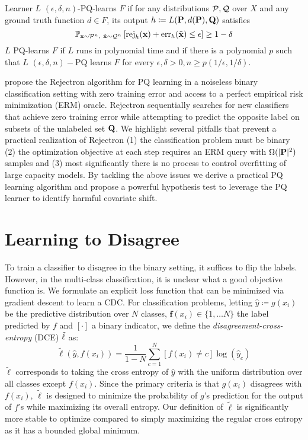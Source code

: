 \begin{definition}
    Learner $L$ $(\epsilon, \delta, n)$-PQ-learns $F$ if for any distributions $\mathcal{P}, \mathcal{Q}$ over $X$ and any ground truth function $d \in F$, its output $h\coloneqq L(\mathbf{P}, d(\mathbf{P}), \mathbf{Q})$ satisfies
    \begin{equation}
        \mathbb{P}_{{\mathbf{x} \sim \Pc^{n}},\ {\tilde{\mathbf{x}} \sim \Qc^{n}}}\left[\text{rej}_h(\mathbf{x})+\operatorname{err}_h(\tilde{\mathbf{x}}) \leq \epsilon\right] \geq 1-\delta
        \label{eq:pqlearn}
    \end{equation}
    $L$ PQ-learns $F$ if $L$ runs in polynomial time and if there is a polynomial $p$ such that $L$ $(\epsilon, \delta, n)-$PQ learns $F$ for every $\epsilon, \delta>0, n \geq p(1 / \epsilon, 1 / \delta)$.
\end{definition}
\citeauthor{pqlearn} propose the Rejectron algorithm for PQ learning in a noiseless binary classification setting with zero training error and access to a perfect empirical risk minimization (ERM) oracle.
Rejectron sequentially searches for new classifiers that achieve zero training error while attempting to predict the opposite label on subsets of the unlabeled set $\mathbf{Q}$.
We highlight several pitfalls that prevent a practical realization of Rejectron (1) the classification problem must be binary (2) the optimization objective at each step requires an ERM query with $\Omega(|\mathbf{P}|^2)$ samples and (3) most significantly there is no process to control overfitting of large capacity models.
By tackling the above issues we derive a practical PQ learning algorithm and propose a powerful hypothesis test to leverage the PQ learner to identify harmful covariate shift.


\section{Learning to Disagree}\label{sec:dis}
To train a classifier to disagree in the binary setting, it suffices to flip the labels.
However, in the multi-class classification, it is unclear what a good objective function is.
We formulate an explicit loss function that can be minimized via gradient descent to learn a CDC.
For classification problems, letting $\hat{y} \coloneqq g(x_i)$ be the predictive distribution over $N$ classes, $\mathbf{f}(x_i)\in \{1,\dots N\}$
the label predicted by $f$ and $[\cdot ]$ a binary indicator, we define the \textit{disagreement-cross-entropy} (DCE) $\small \tilde{\ell}$ as:
\begin{equation}
    \tilde{\ell}(\hat{y}, f(x_i)) =  \frac{1}{1-N} \sum_{c=1}^N [{f(x_i) \neq c}] \log(\hat{y}_c)
    \label{eq:anitcross}
\end{equation}
$\tilde{\ell}$ corresponds to taking the cross entropy of $\hat{y}$ with the uniform distribution over all classes except $f(x_i)$.
Since the primary criteria is that $g(x_i)$ disagrees with $f(x_i)$, $\tilde{\ell}$ is designed to minimize the probability of $g$'s prediction for the output of $f$'s while maximizing its overall entropy.
Our definition of $\tilde{\ell}$ is significantly more stable to optimize compared to simply maximizing the regular cross entropy as it has a bounded global minimum.

